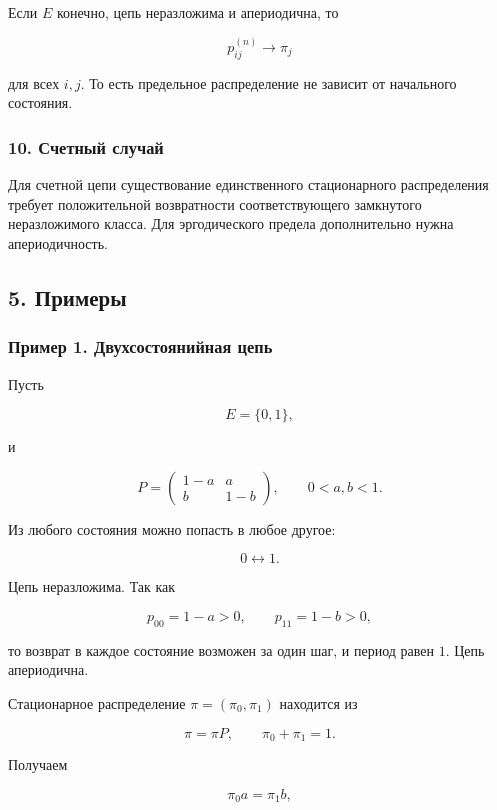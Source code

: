 \documentclass[
  11pt,
  a4paper,
]{article}
\begin{document}
Если \(E\) конечно, цепь неразложима и апериодична, то

\[
p_{ij}^{(n)}\to\pi_j
\]

для всех \(i,j\). То есть предельное распределение не зависит от
начального состояния.

\subsubsection{10. Счетный
случай}\label{ux441ux447ux435ux442ux43dux44bux439-ux441ux43bux443ux447ux430ux439}

Для счетной цепи существование единственного стационарного распределения
требует положительной возвратности соответствующего замкнутого
неразложимого класса. Для эргодического предела дополнительно нужна
апериодичность.

\subsection{5. Примеры}\label{ux43fux440ux438ux43cux435ux440ux44b}

\subsubsection{Пример 1. Двухсостоянийная
цепь}\label{ux43fux440ux438ux43cux435ux440-1.-ux434ux432ux443ux445ux441ux43eux441ux442ux43eux44fux43dux438ux439ux43dux430ux44f-ux446ux435ux43fux44c}

Пусть

\[
E=\{0,1\},
\]

и

\[
P=
\begin{pmatrix}
1-a & a\\
b & 1-b
\end{pmatrix},
\qquad
0<a,b<1.
\]

Из любого состояния можно попасть в любое другое:

\[
0\leftrightarrow1.
\]

Цепь неразложима. Так как

\[
p_{00}=1-a>0,
\qquad
p_{11}=1-b>0,
\]

то возврат в каждое состояние возможен за один шаг, и период равен
\(1\). Цепь апериодична.

Стационарное распределение \(\pi=(\pi_0,\pi_1)\) находится из

\[
\pi=\pi P,
\qquad
\pi_0+\pi_1=1.
\]

Получаем

\[
\pi_0a=\pi_1b,
\]
\end{document}
